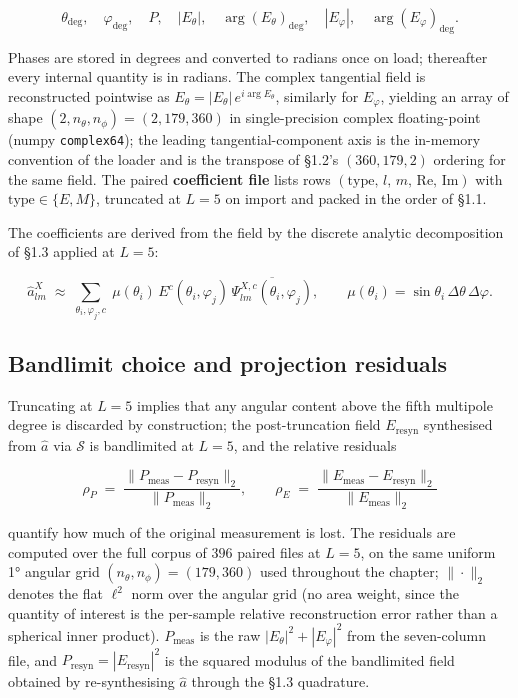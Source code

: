 \documentclass[
  english,
  11pt,
]{report}
\begin{document}
\[
\theta_{\mathrm{deg}},\quad \varphi_{\mathrm{deg}},\quad P,\quad |E_\theta|,\quad \arg(E_\theta)_{\mathrm{deg}},\quad |E_\varphi|,\quad \arg(E_\varphi)_{\mathrm{deg}}.
\]

Phases are stored in degrees and converted to radians once on load;
thereafter every internal quantity is in radians. The complex tangential
field is reconstructed pointwise as
\(E_\theta = |E_\theta|\,e^{i\arg E_\theta}\), similarly for
\(E_\varphi\), yielding an array of shape
\((2, n_\theta, n_\phi) = (2, 179, 360)\) in single-precision complex
floating-point (numpy \texttt{complex64}); the leading
tangential-component axis is the in-memory convention of the loader and
is the transpose of §1.2's \((360, 179, 2)\) ordering for the same
field. The paired \textbf{coefficient file} lists rows
\((\text{type},\,l,\,m,\,\mathrm{Re},\,\mathrm{Im})\) with
\(\text{type}\in\{E, M\}\), truncated at \(L = 5\) on import and packed
in the order of §1.1.

The coefficients are derived from the field by the discrete analytic
decomposition of §1.3 applied at \(L = 5\):

\[
\hat a^X_{lm}\;\approx\;\sum_{\theta_i,\varphi_j,c}\;\mu(\theta_i)\,E^c(\theta_i,\varphi_j)\,\overline{\Psi^{X,c}_{lm}(\theta_i,\varphi_j)},\qquad \mu(\theta_i) = \sin\theta_i\,\Delta\theta\,\Delta\varphi.
\]

\subsection{Bandlimit choice and projection
residuals}\label{bandlimit-choice-and-projection-residuals}

Truncating at \(L = 5\) implies that any angular content above the fifth
multipole degree is discarded by construction; the post-truncation field
\(E_\mathrm{resyn}\) synthesised from \(\hat a\) via \(\mathcal S\) is
bandlimited at \(L = 5\), and the relative residuals

\[
\rho_P\;=\;\frac{\|P_\mathrm{meas} - P_\mathrm{resyn}\|_2}{\|P_\mathrm{meas}\|_2},\qquad \rho_E\;=\;\frac{\|E_\mathrm{meas} - E_\mathrm{resyn}\|_2}{\|E_\mathrm{meas}\|_2}
\]

quantify how much of the original measurement is lost. The residuals are
computed over the full corpus of \(396\) paired files at \(L = 5\), on
the same uniform 1° angular grid \((n_\theta, n_\phi) = (179, 360)\)
used throughout the chapter; \(\|\cdot\|_2\) denotes the flat \(\ell^2\)
norm over the angular grid (no area weight, since the quantity of
interest is the per-sample relative reconstruction error rather than a
spherical inner product). \(P_\mathrm{meas}\) is the raw
\(|E_\theta|^2 + |E_\varphi|^2\) from the seven-column file, and
\(P_\mathrm{resyn} = |E_\mathrm{resyn}|^2\) is the squared modulus of
the bandlimited field obtained by re-synthesising \(\hat a\) through the
§1.3 quadrature.
\end{document}
